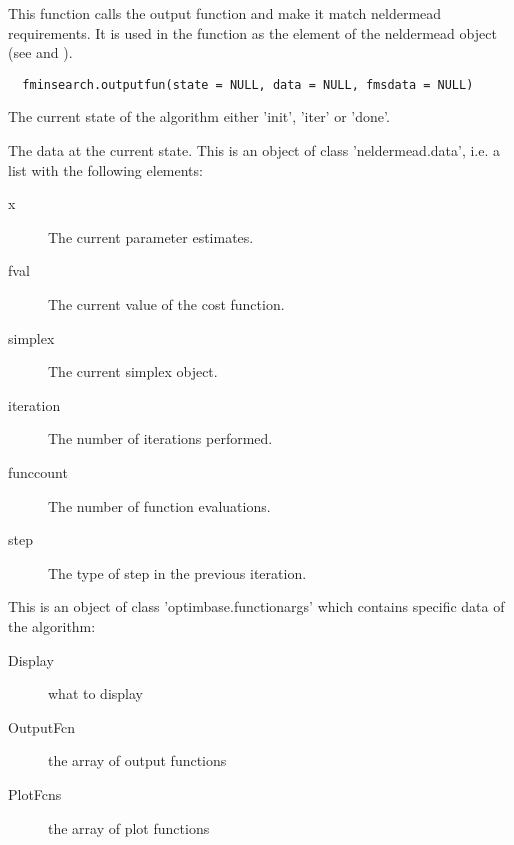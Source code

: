 %
\begin{Description}\relax
This function calls the output function and make it match neldermead
requirements. It is used in the  function as the
 element of the neldermead object (see
 and ).
\end{Description}
%
\begin{Usage}
\begin{verbatim}
  fminsearch.outputfun(state = NULL, data = NULL, fmsdata = NULL)
\end{verbatim}
\end{Usage}
%
\begin{Arguments}
\begin{ldescription}
\item[\code{state}] The current state of the algorithm either 'init', 'iter' or
'done'.
\item[\code{data}] The data at the current state. This is an object of class 
'neldermead.data', i.e. a list with the following elements: \begin{description}

\item[x] The current parameter estimates.
\item[fval] The current value of the cost function.
\item[simplex] The current simplex object.
\item[iteration] The number of iterations performed.
\item[funccount] The number of function evaluations.
\item[step] The type of step in the previous iteration.

\end{description}


\item[\code{fmsdata}] This is an object of class 'optimbase.functionargs' which 
contains specific data of the  algorithm: \begin{description}

\item[Display] what to display
\item[OutputFcn] the array of output functions
\item[PlotFcns] the array of plot functions

\end{description}


\end{ldescription}
\end{Arguments}
